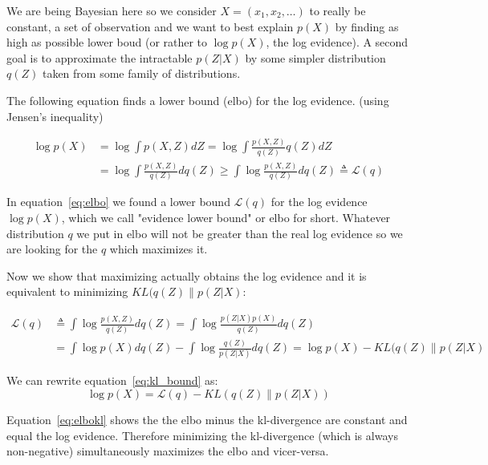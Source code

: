 \documentclass[11pt, a4paper]{report}
\theoremstyle{plain}
\theoremstyle{definition}
\theoremstyle{remark}
\begin{document}
We are being Bayesian here so we consider $X = (x_1, x_2, \dots)$ to really be
constant, a set of observation and we want to best explain $p(X)$ by finding as
high as possible lower boud (or rather to $\log p(X)$, the log evidence).
A second goal is to approximate the intractable $p(Z|X)$ by some simpler
distribution $q(Z)$ taken from some family of distributions.

The following equation finds a lower bound (elbo) for the log evidence.
(using Jensen's inequality)

\begin{equation}\label{eq:elbo}
\begin{aligned}
\log p(X) &= \log \int p(X,Z) dZ = \log \int \frac{p(X,Z)}{q(Z)} q(Z)dZ \\
&= \log \int \frac{p(X,Z)}{q(Z)}dq(Z) 
\geq \int \log \frac{p(X,Z)}{q(Z)}dq(Z) 
\triangleq \mathcal{L}(q)
\end{aligned}
\end{equation}

In equation~\ref{eq:elbo} we found a lower bound $\mathcal{L}(q)$ for the log
evidence $\log p(X)$, which we call "evidence lower bound" or elbo for short.
Whatever distribution $q$ we put in elbo will not be
greater than the real log evidence so we are looking for the $q$ which
maximizes it.

Now we show that maximizing actually obtains the log evidence and it is
equivalent to minimizing $KL(q(Z) \| p(Z|X)$:

\begin{equation}\label{eq:kl_bound}
\begin{aligned}
\mathcal{L}(q) &\triangleq \int \log \frac{p(X,Z)}{q(Z)} d q(Z)
= \int \log \frac{p(Z|X)p(X)}{q(Z)} d q(Z) \\
&= \int \log p(X) dq(Z) - \int \log \frac{q(Z)}{p(Z|X)} dq(Z) 
= \log p(X) - KL(q(Z) \| p(Z|X)
\end{aligned}
\end{equation}

We can rewrite equation~\ref{eq:kl_bound} as:
\begin{equation}\label{eq:elbokl}
\log p(X) = \mathcal{L}(q) - KL(q(Z) \| p(Z|X))
\end{equation}

Equation~\ref{eq:elbokl} shows the the elbo minus the kl-divergence are constant
and equal the log evidence. Therefore minimizing the kl-divergence (which is
always non-negative) simultaneously maximizes the elbo and vicer-versa.
\end{document}
